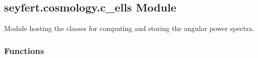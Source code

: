 \documentclass[letterpaper,10pt,english]{sphinxmanual}
\begin{document}
\subsection{seyfert.cosmology.c\_ells Module}
\label{\detokenize{c_ells:module-seyfert.cosmology.c_ells}}\label{\detokenize{c_ells:seyfert-cosmology-c-ells-module}}
\sphinxAtStartPar
Module hosting the classes for computing and storing the angular power spectra.


\subsubsection{Functions}
\label{\detokenize{c_ells:functions}}
\end{document}
